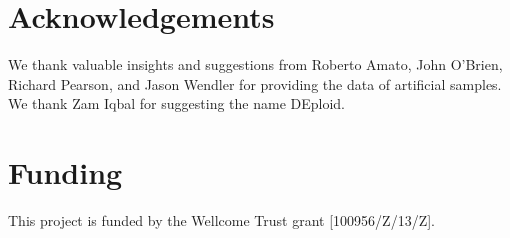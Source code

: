 \documentclass{bioinfo}
\begin{document}
\section*{Acknowledgements}
We thank valuable insights and suggestions from Roberto Amato, John O'Brien, Richard Pearson, and Jason Wendler for providing the data of artificial samples. We thank Zam Iqbal for suggesting the name DEploid.

\section*{Funding}
This project is funded by the Wellcome Trust grant [100956/Z/13/Z].\\
~\\
\end{document}
